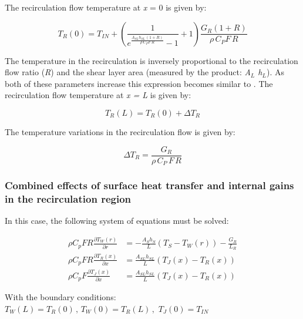 The recirculation flow temperature at \emph{x} = 0 is given by:

\begin{equation}
{T_R}(0) = {T_{IN}} + \left( {\frac{1}{{{e^{\frac{{{A_{SL}}{h_{SL}}\,(1 + R)}}{{\rho \,{C_P}F\,R}}}} - 1}} + 1} \right)\frac{{{G_R}(1 + R)}}{{\rho \,{C_P}F\,R}}
\end{equation}

The temperature in the recirculation is inversely proportional to the recirculation flow ratio (\emph{R}) and the shear layer area (measured by the product: \emph{A\(_{L}\) h\(_{L}\)}). As both of these parameters increase this expression becomes similar to . The recirculation flow temperature at \emph{x = L} is given by:

\begin{equation}
{T_R}(L) = {T_R}(0) + \Delta {T_R}
\end{equation}

The temperature variations in the recirculation flow is given by:

\begin{equation}
\Delta {T_R} = \frac{{{G_R}}}{{\rho \,{C_P}\,F\,R}}
\end{equation}

\subsubsection{Combined effects of surface heat transfer and internal gains in the recirculation region}\label{combined-effects-of-surface-heat-transfer-and-internal-gains-in-the-recirculation-region}

In this case, the following system of equations must be solved:

\begin{equation}
\begin{array}{rl}
    \rho C_p F R \frac{\partial T_W \left(r\right)}{\partial r} & = -\frac{A_S h_S}{L} \left(T_S - T_W \left(r\right)\right) - \frac{G_R}{L_R} \\
    \rho C_p F R \frac{\partial T_R \left(x\right)}{\partial x} & = \frac{A_{SL} h_{SL}}{L} \left(T_J\left(x\right) - T_R \left(x\right)\right) \\
    \rho C_p F \frac{\partial T_J \left(x\right)}{\partial x} & = \frac{A_{SL} h_{SL}}{L} \left(T_J\left(x\right) - T_R \left(x\right)\right) 
  \end{array}
\end{equation}

With the boundary conditions: \({T_W}(L) = {T_R}(0)\,,\,{T_W}(0) = {T_R}(L)\,,\,\,{T_J}(0) = {T_{IN}}\)

